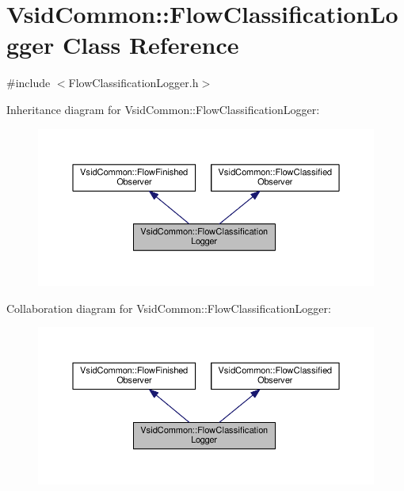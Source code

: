 \hypertarget{class_vsid_common_1_1_flow_classification_logger}{\section{Vsid\-Common\-:\-:Flow\-Classification\-Logger Class Reference}
\label{class_vsid_common_1_1_flow_classification_logger}
}


{\ttfamily \#include $<$Flow\-Classification\-Logger.\-h$>$}



Inheritance diagram for Vsid\-Common\-:\-:Flow\-Classification\-Logger\-:
\nopagebreak
\begin{figure}[H]
\begin{center}
\leavevmode
\includegraphics[width=350pt]{class_vsid_common_1_1_flow_classification_logger__inherit__graph}
\end{center}
\end{figure}


Collaboration diagram for Vsid\-Common\-:\-:Flow\-Classification\-Logger\-:
\nopagebreak
\begin{figure}[H]
\begin{center}
\leavevmode
\includegraphics[width=350pt]{class_vsid_common_1_1_flow_classification_logger__coll__graph}
\end{center}
\end{figure}
